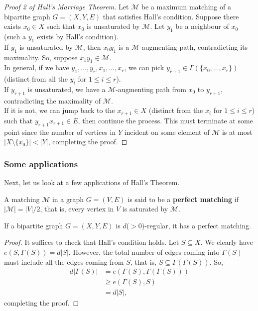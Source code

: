 			\begin{proof}[Proof 2 of Hall's Marriage Theorem]
				Let $\mathcal{M}$ be a maximum matching of a bipartite graph $G=(X,Y,E)$ that satisfies Hall's condition. Suppose there exists $x_0 \in X$ such that $x_0$ is unsaturated by $\mathcal{M}$. Let $y_1$ be a neighbour of $x_0$ (such a $y_1$ exists by Hall's condition).\\
				If $y_1$ is unsaturated by $\mathcal{M}$, then $x_0y_1$ is a $\mathcal{M}$-augmenting path, contradicting its maximality. So, suppose $x_1y_1 \in \mathcal{M}$.\\
				In general, if we have $y_1,\ldots,y_r,x_1,\ldots,x_r$, we can pick $y_{r+1}\in \Gamma(\{x_0,\ldots,x_r\})$ (distinct from all the $y_i$ for $1\le i\le r$).\\
				If $y_{r+1}$ is unsaturated, we have a $\mathcal{M}$-augmenting path from $x_0$ to $y_{r+1}$, contradicting the maximality of $\mathcal{M}$.\\
				If it is not, we can jump back to the $x_{r+1}\in X$ (distinct from the $x_i$ for $1\le i\le r$) such that $y_{r+1}x_{r+1} \in E$, then continue the process. This must terminate at some point since the number of vertices in $Y$ incident on some element of $\mathcal{M}$ is at most $|X\setminus\{x_0\}|< |Y|$, completing the proof.
			\end{proof}

		\subsubsection{Some applications}

			Next, let us look at a few applications of Hall's Theorem.

			\begin{fdef}
				A matching $\mathcal{M}$ in a graph $G=(V,E)$ is said to be a \textbf{perfect matching} if $|\mathcal{M}| = |V|/2$, that is, every vertex in $V$ is saturated by $\mathcal{M}$.
			\end{fdef}

			\begin{ftheo}
				\label{ftheo: regular bipartite graph has a perfect matching}
				If a bipartite graph $G=(X,Y,E)$ is $d$($>0$)-regular, it has a perfect matching.
			\end{ftheo}
			\begin{proof}
				It suffices to check that Hall's condition holds. Let $S\subseteq X$. We clearly have $e(S,\Gamma(S))=d|S|$. However, the total number of edges coming into $\Gamma(S)$ must include all the edges coming from $S$, that is, $S\subseteq\Gamma(\Gamma(S))$. So,
				\begin{align*}
					d|\Gamma(S)| &= e(\Gamma(S),\Gamma(\Gamma(S))) \\
						&\ge e(\Gamma(S),S) \\
						&= d|S|,
				\end{align*}
				completing the proof.
			\end{proof}

